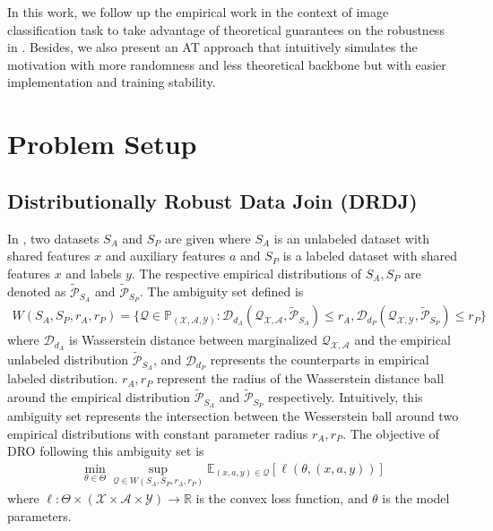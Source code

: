 \documentclass{article}
\begin{document}
In this work, we follow up the empirical work in the context of image 
classification task to take advantage of theoretical guarantees on 
the robustness in \citep{awasthi2022distributionally}. Besides, we also present an AT approach that intuitively
simulates the motivation with more randomness and less theoretical backbone
but with easier implementation and training stability.

\section{Problem Setup}
\subsection{Distributionally Robust Data Join (DRDJ)}
In \citep{awasthi2022distributionally}, two datasets $S_A$ and $S_P$ are 
given where $S_A$ is an unlabeled dataset with shared features $x$ and auxiliary features $a$ and 
$S_P$ is a labeled dataset with shared features $x$ and labels $y$. The 
respective empirical distributions of $S_A, S_P$ are denoted as 
$\tilde{\mathcal{P}}_{S_A}$ and $\tilde{\mathcal{P}}_{S_P}$. The 
ambiguity set defined is 
\begin{align*}
  W(S_A, S_P, r_A, r_P) = \{ \mathcal{Q} \in \mathbb{P}_{(\mathcal{X}, \mathcal{A}, \mathcal{Y})}  : \mathcal{D}_{d_A}(\mathcal{Q}_{\mathcal{X}, \mathcal{A}}, \tilde{\mathcal{P}}_{S_A}) \le r_A, \mathcal{D}_{d_P}(\mathcal{Q}_{\mathcal{X}, \mathcal{Y}}, \tilde{\mathcal{P}}_{S_P}) \le r_P\}
\end{align*}
where $\mathcal{D}_{d_A}$ is Wasserstein distance between marginalized $\mathcal{Q}_{\mathcal{X}, \mathcal{A}}$ and the empirical unlabeled distribution $\tilde{\mathcal{P}}_{S_A}$,
and $\mathcal{D}_{d_P}$ represents the counterparts in empirical labeled distribution. $r_A, r_P$ represent the radius 
of the Wasserstein distance ball around the empirical distribution $\tilde{\mathcal{P}}_{S_A}$ and $\tilde{\mathcal{P}}_{S_P}$
respectively. Intuitively, this ambiguity set represents the intersection between 
the Wesserstein ball around two empirical distributions with constant parameter radius 
$r_A, r_P$.  The objective of DRO following this ambiguity set is
\begin{align*}
  \min_{\theta \in \Theta} \sup_{\mathcal{Q} \in W(S_A, S_P, r_A, r_P)} \mathbb{E}_{(x, a, y) \in \mathcal{Q}} [\ell (\theta, (x, a, y))]
\end{align*}
where $\ell: \Theta \times (\mathcal{X} \times \mathcal{A} \times \mathcal{Y}) \to \mathbb{R}$ is the convex loss function, and 
$\theta$ is the model parameters. 
\end{document}
